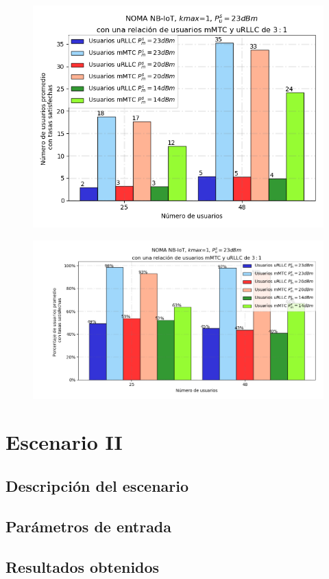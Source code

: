 \begin{figure}
    \centering
    \begin{minipage}{.45\linewidth}
      \includegraphics[width=\linewidth]{Figures/ResultadosNOMA/Kmax1_DiferentesPM.png}
      \label{fig:img1}
    \end{minipage}
    \hspace{.0\linewidth}
    \begin{minipage}{.45\linewidth}
      \includegraphics[width=\linewidth]{Figures/ResultadosNOMA/Kmax1_DiferentesPM_Porcentual.png}
      \label{fig:img2}
    \end{minipage}
\end{figure}



\section{Escenario II} %
\subsection{Descripción del escenario}
\subsection{Parámetros de entrada}
\subsection{Resultados obtenidos}

